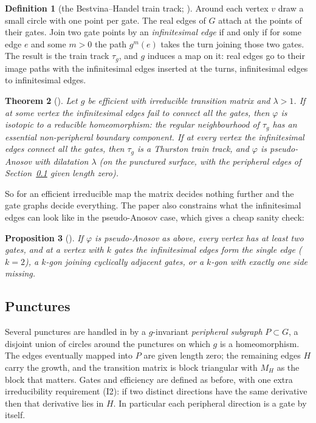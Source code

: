 \documentclass[12pt]{amsart}
\newcommand{\ho}{\varphi}                 %
\newcommand{\trk}{\tau}                   %
\newcommand{\per}{P}                      %
\newcommand{\lam}{\lambda}
\theoremstyle{plain}
\newtheorem{Theorem}{Theorem}[section]
\newtheorem{Proposition}[Theorem]{Proposition}
\theoremstyle{definition}
\newtheorem{Definition}[Theorem]{Definition}
\begin{document}
\begin{Definition}[the Bestvina--Handel train track; {\cite[\S3.3]{Bestvina1995}}]
  Around each vertex $v$ draw a small circle with one point per gate.
  The real edges of $G$ attach at the points of their gates.  Join two
  gate points by an \emph{infinitesimal edge} if and only if for some edge
  $e$ and some $m>0$ the path $g^m(e)$ takes the turn joining those two
  gates.  The result is the train track $\trk_g$, and $g$ induces a map on
  it: real edges go to their image paths with the infinitesimal edges
  inserted at the turns, infinitesimal edges to infinitesimal edges.
\end{Definition}

\begin{Theorem}[{\cite[Prop.~3.3.2, Thm.~3.1.4, Thm.~4.1.4]{Bestvina1995}}]
  \label{thm:bh}
  Let $g$ be efficient with irreducible transition matrix and $\lam>1$.
  If at some vertex the infinitesimal edges fail to connect all the
  gates, then $\ho$ is isotopic to a reducible homeomorphism: the regular
  neighbourhood of $\trk_g$ has an essential non-peripheral boundary
  component.  If at every vertex the infinitesimal edges connect all the
  gates, then $\trk_g$ is a Thurston train track, and $\ho$ is
  pseudo-Anosov with dilatation $\lam$ (on the punctured surface, with
  the peripheral edges of Section~\ref{sec:punctures} given length zero).
\end{Theorem}

So for an efficient irreducible map the matrix decides nothing further
and the gate graphs decide everything.  The paper also constrains what
the infinitesimal edges can look like in the pseudo-Anosov case, which
gives a cheap sanity check:

\begin{Proposition}[{\cite[Props.~3.3.3--3.3.4]{Bestvina1995}}]
  \label{prop:shape}
  If $\ho$ is pseudo-Anosov as above, every vertex has at least two
  gates, and at a vertex with $k$ gates the infinitesimal edges form the
  single edge ($k=2$), a $k$-gon joining cyclically adjacent gates, or a
  $k$-gon with exactly one side missing.
\end{Proposition}

\subsection{Punctures}
\label{sec:punctures}
Several punctures are handled in \cite[\S4]{Bestvina1995} by a
$g$-invariant \emph{peripheral subgraph} $\per\subset G$, a disjoint
union of circles around the punctures on which $g$ is a homeomorphism.
The edges eventually mapped into $\per$ are given length zero; the
remaining edges $H$ carry the growth, and the transition matrix is block
triangular with $M_H$ as the block that matters.  Gates and efficiency
are defined as before, with one extra irreducibility requirement (I2):
if two distinct directions have the same derivative then that derivative
lies in $H$.  In particular each peripheral direction is a gate by itself.
\end{document}
